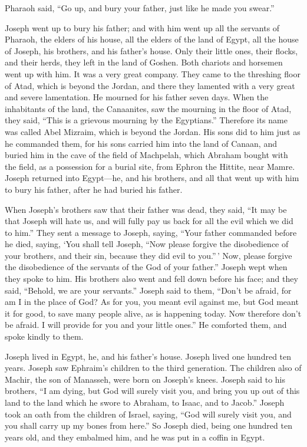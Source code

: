  Pharaoh said, ``Go up, and bury your father, just like he
made you swear.''

 Joseph went up to bury his father; and with him went up all
the servants of Pharaoh, the elders of his house, all the elders of the
land of Egypt,  all the house of Joseph, his brothers, and
his father's house. Only their little ones, their flocks, and their
herds, they left in the land of Goshen.  Both chariots and
horsemen went up with him. It was a very great company. 
They came to the threshing floor of Atad, which is beyond the Jordan,
and there they lamented with a very great and severe lamentation. He
mourned for his father seven days.  When the inhabitants of
the land, the Canaanites, saw the mourning in the floor of Atad, they
said, ``This is a grievous mourning by the Egyptians.'' Therefore its
name was called Abel Mizraim, which is beyond the Jordan. 
His sons did to him just as he commanded them,  for his
sons carried him into the land of Canaan, and buried him in the cave of
the field of Machpelah, which Abraham bought with the field, as a
possession for a burial site, from Ephron the Hittite, near Mamre.
 Joseph returned into Egypt---he, and his brothers, and all
that went up with him to bury his father, after he had buried his
father.

 When Joseph's brothers saw that their father was dead,
they said, ``It may be that Joseph will hate us, and will fully pay us
back for all the evil which we did to him.''  They sent a
message to Joseph, saying, ``Your father commanded before he died,
saying,  `You shall tell Joseph, ``Now please forgive the
disobedience of your brothers, and their sin, because they did evil to
you.''\,' Now, please forgive the disobedience of the servants of the
God of your father.'' Joseph wept when they spoke to him. 
His brothers also went and fell down before his face; and they said,
``Behold, we are your servants.''  Joseph said to them,
``Don't be afraid, for am I in the place of God?  As for
you, you meant evil against me, but God meant it for good, to save many
people alive, as is happening today.  Now therefore don't
be afraid. I will provide for you and your little ones.'' He comforted
them, and spoke kindly to them.

 Joseph lived in Egypt, he, and his father's house. Joseph
lived one hundred ten years.  Joseph saw Ephraim's children
to the third generation. The children also of Machir, the son of
Manasseh, were born on Joseph's knees.  Joseph said to his
brothers, ``I am dying, but God will surely visit you, and bring you up
out of this land to the land which he swore to Abraham, to Isaac, and to
Jacob.''  Joseph took an oath from the children of Israel,
saying, ``God will surely visit you, and you shall carry up my bones
from here.''  So Joseph died, being one hundred ten years
old, and they embalmed him, and he was put in a coffin in Egypt.

